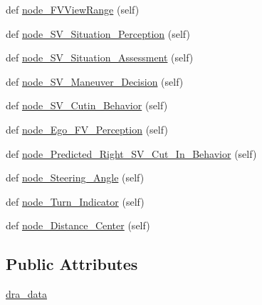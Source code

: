 \begin{DoxyCompactItemize}
\item 
def \hyperlink{classbayesian__network__config_1_1_bayesian_network_config_a14bac441795a8f3c96df9342dff6ecc2}{node\+\_\+\+F\+V\+View\+Range} (self)
\item 
def \hyperlink{classbayesian__network__config_1_1_bayesian_network_config_a1eb21f6bfb872d4c8773615d265c3727}{node\+\_\+\+S\+V\+\_\+\+Situation\+\_\+\+Perception} (self)
\item 
def \hyperlink{classbayesian__network__config_1_1_bayesian_network_config_a542c4ed5d49ca145684cfcff7a6e90f6}{node\+\_\+\+S\+V\+\_\+\+Situation\+\_\+\+Assessment} (self)
\item 
def \hyperlink{classbayesian__network__config_1_1_bayesian_network_config_a978dd92b9826d22d6e521630d0a34379}{node\+\_\+\+S\+V\+\_\+\+Maneuver\+\_\+\+Decision} (self)
\item 
def \hyperlink{classbayesian__network__config_1_1_bayesian_network_config_a6510c23dac8fb0c36ee38283e5815d54}{node\+\_\+\+S\+V\+\_\+\+Cutin\+\_\+\+Behavior} (self)
\item 
def \hyperlink{classbayesian__network__config_1_1_bayesian_network_config_aff3733f4b57dcb4c4cbc0184ea07c133}{node\+\_\+\+Ego\+\_\+\+F\+V\+\_\+\+Perception} (self)
\item 
def \hyperlink{classbayesian__network__config_1_1_bayesian_network_config_a7563ca52e9383e33c2d97b8c26c923d8}{node\+\_\+\+Predicted\+\_\+\+Right\+\_\+\+S\+V\+\_\+\+Cut\+\_\+\+In\+\_\+\+Behavior} (self)
\item 
def \hyperlink{classbayesian__network__config_1_1_bayesian_network_config_a27d247927ce168025568fdf0d467b78d}{node\+\_\+\+Steering\+\_\+\+Angle} (self)
\item 
def \hyperlink{classbayesian__network__config_1_1_bayesian_network_config_ac9fee7655297b9617622e9c4d4669a23}{node\+\_\+\+Turn\+\_\+\+Indicator} (self)
\item 
def \hyperlink{classbayesian__network__config_1_1_bayesian_network_config_a3cf26cc8ccfdff070ff06302ce79f4f5}{node\+\_\+\+Distance\+\_\+\+Center} (self)
\end{DoxyCompactItemize}
\subsection*{Public Attributes}
\begin{DoxyCompactItemize}
\item 
\hyperlink{classbayesian__network__config_1_1_bayesian_network_config_aa80a7563c87c07c57e7c1318e147353e}{dra\+\_\+data}
\end{DoxyCompactItemize}


